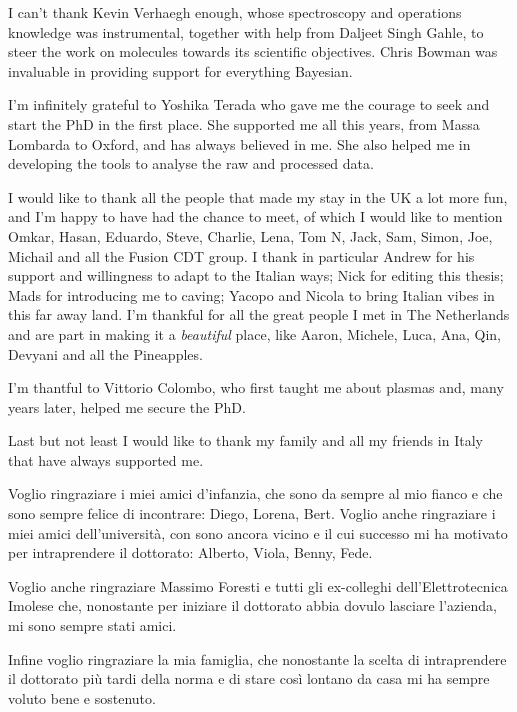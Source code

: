 \documentclass[]{yorkThesis}  %
\begin{document}
I can't thank Kevin Verhaegh enough, whose spectroscopy and operations knowledge was instrumental, together with help from Daljeet Singh Gahle, to steer the work on molecules towards its scientific objectives. Chris Bowman was invaluable in providing support for everything Bayesian.

I'm infinitely grateful to Yoshika Terada who gave me the courage to seek and start the PhD in the first place. She supported me all this years, from Massa Lombarda to Oxford, and has always believed in me. She also helped me in developing the tools to analyse the raw and processed data.

I would like to thank all the people that made my stay in the UK a lot more fun, and I'm happy to have had the chance to meet, of which I would like to mention Omkar, Hasan, Eduardo, Steve, Charlie, Lena, Tom N, Jack, Sam, Simon, Joe, Michail and all the Fusion CDT group. I thank in particular Andrew for his support and willingness to adapt to the Italian ways; Nick for editing this thesis; Mads for introducing me to caving; Yacopo and Nicola to bring Italian vibes in this far away land. I'm thankful for all the great people I met in The Netherlands and are part in making it a \emph{beautiful} place, like Aaron, Michele, Luca, Ana, Qin, Devyani and all the Pineapples.

I'm thantful to Vittorio Colombo, who first taught me about plasmas and, many years later, helped me secure the PhD.

Last but not least I would like to thank my family and all my friends in Italy that have always supported me.

Voglio ringraziare i miei amici d'infanzia, che sono da sempre al mio fianco e che sono sempre felice di incontrare: Diego, Lorena, Bert. Voglio anche ringraziare i miei amici dell'università, con sono ancora vicino e il cui successo mi ha motivato per intraprendere il dottorato: Alberto, Viola, Benny, Fede.

Voglio anche ringraziare Massimo Foresti e tutti gli ex-colleghi dell'Elettrotecnica Imolese che, nonostante per iniziare il dottorato abbia dovulo lasciare l'azienda, mi sono sempre stati amici.

Infine voglio ringraziare la mia famiglia, che nonostante la scelta di intraprendere il dottorato più tardi della norma e di stare così lontano da casa mi ha sempre voluto bene e sostenuto.\\
\end{document}

